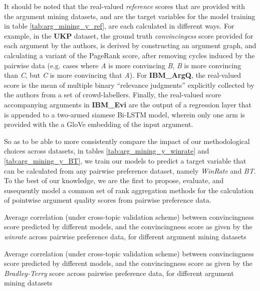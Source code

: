 \documentclass[notitlepage,12pt]{jedm}
\begin{document}
It should be noted that the real-valued \textit{reference} scores that are 
provided with the argument mining datasets, and are the target variables for 
the model training in table \ref{tab:arg_mining_y_ref}, are each 
calculated in different ways. 
For example, in the \textbf{UKP} dataset, the ground truth 
\textit{convincingess} score provided for each argument by the authors, is 
derived by constructing an argument graph, and calculating a variant of the 
PageRank score, after removing cycles induced by the pairwise data (e.g. cases 
where \textit{A} is more convincing \textit{B}, \textit{B} is more convincing 
than \textit{C}, but \textit{C} is more convincing that \textit{A}).
For \textbf{IBM\_ArgQ}, the real-valued score is the mean of multiple binary 
``relevance judgments'' explicitly collected by the authors from a set of 
crowd-labellers.
Finally, the real-valued score accompanying arguments in \textbf{IBM\_Evi} are 
the output of a regression layer that is appended to a two-armed siamese 
Bi-LSTM model, wherein only one arm is provided with the a GloVe embedding of 
the input argument.

So as to be able to more consistently compare the impact of our methodological 
choices across datasets, in tables \ref{tab:arg_mining_y_winrate} and 
\ref{tab:arg_mining_y_BT}, we 
train our models to predict a target variable that can be calculated from any 
pairwise preference dataset, namely \textit{WinRate} and \textit{BT}.
To the best of our knowledge, we are the first to propose, evaluate, and 
susequently model a common set of rank aggregation methods for the calculation 
of pointwise argument quality scores from pairwise preference data.

\begin{table}
	\parbox{.45\linewidth}{
		\centering
		
	}
	\hfill
	\parbox{.45\linewidth}{
		\centering
		
	}
	\caption{
		Average correlation (under cross-topic validation scheme) between 
		convincingness score predicted by different models, and the 
		convincingness score as given by the \textit{winrate} across pairwise 
		preference data, for different argument mining datasets
	}
	\label{tab:arg_mining_y_winrate}
\end{table}


\begin{table}
	\parbox{.45\linewidth}{
		\centering
		
	}
	\hfill
	\parbox{.45\linewidth}{
		\centering
		
	}
	\caption{
		Average correlation (under cross-topic validation scheme) between 
		convincingness score predicted by different models, and the 
		convincingness score as given by the \textit{Bradley-Terry} score 
		across pairwise preference data, for different argument mining datasets
	}
	\label{tab:arg_mining_y_BT}
\end{table}
\end{document}
